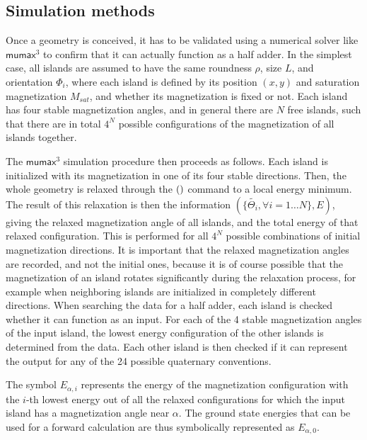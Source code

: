 \documentclass[11pt,a4paper,english]{article}
\newcommand{\mumax}{$\mathsf{mumax}^3$}
\begin{document}
\subsection{Simulation methods}
Once a geometry is conceived, it has to be validated using a numerical solver like \mumax{} to confirm that it can actually function as a half adder. In the simplest case, all islands are assumed to have the same roundness $\rho$, size $L$, and orientation $\Phi_i$, where each island is defined by its position $(x,y)$ and saturation magnetization $M_{sat}$, and whether its magnetization is fixed or not. Each island has four stable magnetization angles, and in general there are $N$ free islands, such that there are in total $4^N$ possible configurations of the magnetization of all islands together. \par
The \mumax{} simulation procedure then proceeds as follows. Each island is initialized with its magnetization in one of its four stable directions. Then, the whole geometry is relaxed through the $\relax()$ command to a local energy minimum. The result of this relaxation is then the information $(\{\widetilde{\Theta_i}, \forall i=1\dots N\}, E)$, giving the relaxed magnetization angle of all islands, and the total energy of that relaxed configuration. This is performed for all $4^N$ possible combinations of initial magnetization directions. It is important that the relaxed magnetization angles are recorded, and not the initial ones, because it is of course possible that the magnetization of an island rotates significantly during the relaxation process, for example when neighboring islands are initialized in completely different directions. When searching the data for a half adder, each island is checked whether it can function as an input. For each of the 4 stable magnetization angles of the input island, the lowest energy configuration of the other islands is determined from the data. Each other island is then checked if it can represent the output for any of the 24 possible quaternary conventions. \par
The symbol $E_{\alpha,i}$ represents the energy of the magnetization configuration with the $i$-th lowest energy out of all the relaxed configurations for which the input island has a magnetization angle near $\alpha$. The ground state energies that can be used for a forward calculation are thus symbolically represented as $E_{\alpha,0}$.
\end{document}
